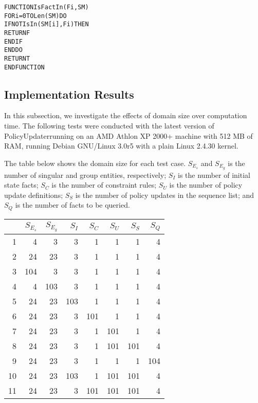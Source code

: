 \documentclass[global,twocolumn,final]{svjour}
\newenvironment{vquote}
  {\begin{list}{}{\leftmargin 1em}\item[]}
  {\end{list}}
\newenvironment{vverbatim}
  {\begin{alltt}}
  {\vspace{-\baselineskip}\end{alltt}}
\begin{document}
        \begin{vverbatim}
FUNCTION IsFactIn(Fi, SM)
  FOR i = 0 TO Len(SM) DO
    IF NOT IsIn(SM[i], Fi) THEN
      RETURN F
    ENDIF
  ENDDO
  RETURN T
ENDFUNCTION
        \end{vverbatim}

    \subsection{Implementation Results}

      In this subsection, we investigate the effects of domain size over
      computation time. The following tests were conducted with the latest
      version of PolicyUpdater\footnotemark running on an AMD Athlon
      XP 2000+ machine with 512 MB of RAM, running Debian GNU/Linux 3.0r5
      with a plain Linux 2.4.30 kernel.


      The table below shows the domain size for each test case. $S_{E_{s}}$ and
      $S_{E_{g}}$ is the number of singular and group entities, respectively;
      $S_{I}$ is the number of initial state facts; $S_{C}$ is the number of
      constraint rules; $S_{U}$ is the number of policy update definitions;
      $S_{S}$ is the number of policy updates in the sequence list; and
      $S_{Q}$ is the number of facts to be queried.

      \begin{vquote}
        \begin{tabular}[t]{|r|r|r|r|r|r|r|r|}
          \hline 
          &
          \textbf{$S_{E_{s}}$} &
          \textbf{$S_{E_{g}}$} &
          \textbf{$S_{I}$} &
          \textbf{$S_{C}$} &
          \textbf{$S_{U}$} &
          \textbf{$S_{S}$} &
          \textbf{$S_{Q}$} \\
          \hline 
          1 & 4 & 3 & 3 & 1 & 1 & 1 & 4 \\
          \hline 
          2 & 24 & 23 & 3 & 1 & 1 & 1 & 4 \\
          \hline 
          3 & 104 & 3 & 3 & 1 & 1 & 1 & 4 \\
          \hline 
          4 & 4 & 103 & 3 & 1 & 1 & 1 & 4 \\
          \hline
          5 & 24 & 23 & 103 & 1 & 1 & 1 & 4 \\
          \hline
          6 & 24 & 23 & 3 & 101 & 1 & 1 & 4 \\
          \hline
          7 & 24 & 23 & 3 & 1 & 101 & 1 & 4 \\
          \hline
          8 & 24 & 23 & 3 & 1 & 101 & 101 & 4 \\
          \hline
          9 & 24 & 23 & 3 & 1 & 1 & 1 & 104 \\
          \hline
          10 & 24 & 23 & 103 & 1 & 101 & 101 & 4 \\
          \hline
          11 & 24 & 23 & 3 & 101 & 101 & 101 & 4 \\
          \hline
        \end{tabular}
      \end{vquote}
\end{document}
